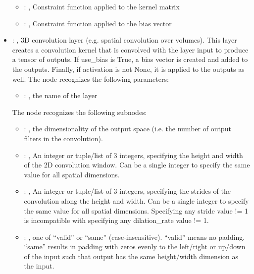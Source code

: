 \begin{itemize}
\begin{itemize}
        \item {}: , 
          Constraint function applied to the kernel matrix

        \item {}: , 
          Constraint function applied to the bias vector
      \end{itemize}

    \item {}: , 
      3D convolution layer (e.g. spatial convolution over volumes). This layer creates a convolution
      kernel that is convolved with the layer input to produce a tensor of outputs. If use\_bias is
      True, a         bias vector is created and added to the outputs. Finally, if activation is not
      None, it is applied to         the outputs as well.
      The  node recognizes the following parameters:
        \begin{itemize}
          \item {}: , 
            the name of the layer
      \end{itemize}

      The  node recognizes the following subnodes:
      \begin{itemize}
        \item {}: , 
          the dimensionality of the output space (i.e. the number of output filters in the
          convolution).

        \item {}: , 
          An integer or tuple/list of 3 integers, specifying the height and width of the 2D
          convolution window.         Can be a single integer to specify the same value for all
          spatial dimensions.

        \item {}: , 
          An integer or tuple/list of 3 integers, specifying the strides of the convolution along
          the height         and width. Can be a single integer to specify the same value for all
          spatial dimensions. Specifying any         stride value != 1 is incompatible with
          specifying any dilation\_rate value != 1.

        \item {}: , 
          one of ``valid'' or ``same'' (case-insensitive). ``valid'' means no padding. ``same''
          results in padding         with zeros evenly to the left/right or up/down of the input
          such that output has the same height/width         dimension as the input.


\end{itemize}
\end{itemize}
